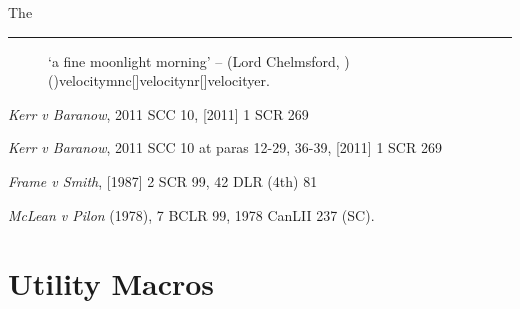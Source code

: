 \bigskip


The 

\bigskip
\hrule






\begin{figure}
\begin{center}
\end{center}
\caption[`a fine moonlight morning']{`a fine moonlight morning' -- \lawcitesinlinerr(Lord Chelmsford, )(){velocitymnc}[]{velocitynr}[]{velocityer}.
}
\label{fig:velocity}
\end{figure}

\newpage

\noindent \textit{Kerr v Baranow}, 2011 SCC 10, [2011] 1 SCR 269

\noindent \textit{Kerr v Baranow}, 2011 SCC 10 at paras 12-29, 36-39, [2011] 1 SCR 269

\lcsetstylemcgill
\noindent {}
\lcsetstyledefault

\noindent \textit{Frame v Smith}, [1987] 2 SCR 99, 42 DLR (4th) 81

\setmulticitecommaon
\setcasenamecommaon
\noindent {}
\setmulticitecommaoff
\setcasenamecommaoff

%
\noindent \textit{McLean v Pilon} (1978), 7 BCLR 99, 1978 CanLII 237 (SC).

\lcsetstylemcgill
\noindent {}



\section{Utility Macros}
\lcsetdemooff
\lcsetindexingoff

\\
\\
\\
\\

